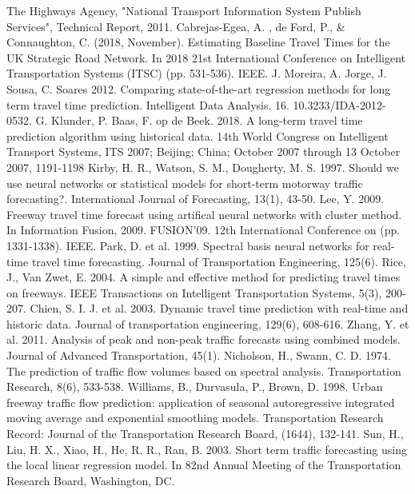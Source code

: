 \documentclass[a4paper, 10pt, conference]{ieeeconf}      %
\begin{document}
\begin{thebibliography}{00}
 The Highways Agency, "National Transport Information System Publish Services", Technical Report, 2011. 
 Cabrejas-Egea, A. , de Ford, P., \& Connaughton, C. (2018, November). Estimating Baseline Travel Times for the UK Strategic Road Network. In 2018 21st International Conference on Intelligent Transportation Systems (ITSC) (pp. 531-536). IEEE.
 J. Moreira, A. Jorge, J. Sousa, C. Soares 2012. Comparing state-of-the-art regression methods for long term travel time prediction. Intelligent Data Analysis. 16. 10.3233/IDA-2012-0532. 
 G. Klunder, P. Baas, F. op de Beek. 2018. A long-term travel time prediction algorithm using historical data. 14th World Congress on Intelligent Transport Systems, ITS 2007; Beijing; China; October 2007 through 13 October 2007, 1191-1198
 Kirby, H. R., Watson, S. M., Dougherty, M. S. 1997. Should we use neural networks or statistical models for short-term motorway traffic forecasting?. International Journal of Forecasting, 13(1), 43-50.
 Lee, Y. 2009. Freeway travel time forecast using artifical neural networks with cluster method. In Information Fusion, 2009. FUSION'09. 12th International Conference on (pp. 1331-1338). IEEE.
 Park, D. et al. 1999. Spectral basis neural networks for real-time travel time forecasting. Journal of Transportation Engineering, 125(6).
 Rice, J., Van Zwet, E. 2004. A simple and effective method for predicting travel times on freeways. IEEE Transactions on Intelligent Transportation Systems, 5(3), 200-207.
 Chien, S. I. J. et al. 2003. Dynamic travel time prediction with real-time and historic data. Journal of transportation engineering, 129(6), 608-616.
 Zhang, Y. et al. 2011. Analysis of peak and non-peak traffic forecasts using combined models. Journal of Advanced Transportation, 45(1).
 Nicholson, H., Swann, C. D. 1974. The prediction of traffic flow volumes based on spectral analysis. Transportation Research, 8(6), 533-538.
 Williams, B., Durvasula, P., Brown, D. 1998. Urban freeway traffic flow prediction: application of seasonal autoregressive integrated moving average and exponential smoothing models. Transportation Research Record: Journal of the Transportation Research Board, (1644), 132-141.
 Sun, H., Liu, H. X., Xiao, H., He, R. R., Ran, B. 2003. Short term traffic forecasting using the local linear regression model. In 82nd Annual Meeting of the Transportation Research Board, Washington, DC.

\end{thebibliography}
\end{document}
